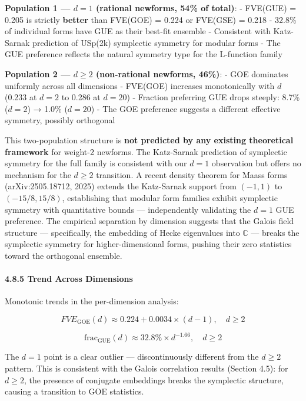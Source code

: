 \documentclass[
]{article}
\begin{document}
\textbf{Population 1 --- \(d=1\) (rational newforms, 54\% of total)}: -
FVE(GUE) = 0.205 is strictly \textbf{better} than FVE(GOE) = 0.224 or
FVE(GSE) = 0.218 - 32.8\% of individual forms have GUE as their best-fit
ensemble - Consistent with Katz-Sarnak prediction of USp(2k) symplectic
symmetry for modular forms - The GUE preference reflects the natural
symmetry type for the L-function family

\textbf{Population 2 --- \(d \ge 2\) (non-rational newforms, 46\%)}: -
GOE dominates uniformly across all dimensions - FVE(GOE) increases
monotonically with \(d\) (0.233 at \(d=2\) to 0.286 at \(d=20\)) -
Fraction preferring GUE drops steeply: 8.7\% (\(d=2\)) → 1.0\%
(\(d=20\)) - The GOE preference suggests a different effective symmetry,
possibly orthogonal

This two-population structure is \textbf{not predicted by any existing
theoretical framework} for weight-2 newforms. The Katz-Sarnak prediction
of symplectic symmetry for the full family is consistent with our
\(d=1\) observation but offers no mechanism for the \(d\ge 2\)
transition. A recent density theorem for Maass forms (arXiv:2505.18712,
2025) extends the Katz-Sarnak support from \((-1,1)\) to
\((-15/8, 15/8)\), establishing that modular form families exhibit
symplectic symmetry with quantitative bounds --- independently
validating the \(d=1\) GUE preference. The empirical separation by
dimension suggests that the Galois field structure --- specifically, the
embedding of Hecke eigenvalues into \(\mathbb{C}\) --- breaks the
symplectic symmetry for higher-dimensional forms, pushing their zero
statistics toward the orthogonal ensemble.

\hypertarget{trend-across-dimensions}{%
\paragraph{4.8.5 Trend Across
Dimensions}\label{trend-across-dimensions}}

Monotonic trends in the per-dimension analysis:

\[FVE_{\text{GOE}}(d) \approx 0.224 + 0.0034 \times (d-1), \quad d \ge 2\]

\[\text{frac}_{\text{GUE}}(d) \approx 32.8\% \times d^{-1.66}, \quad d \ge 2\]

The \(d=1\) point is a clear outlier --- discontinuously different from
the \(d \ge 2\) pattern. This is consistent with the Galois correlation
results (Section 4.5): for \(d \ge 2\), the presence of conjugate
embeddings breaks the symplectic structure, causing a transition to GOE
statistics.
\end{document}
